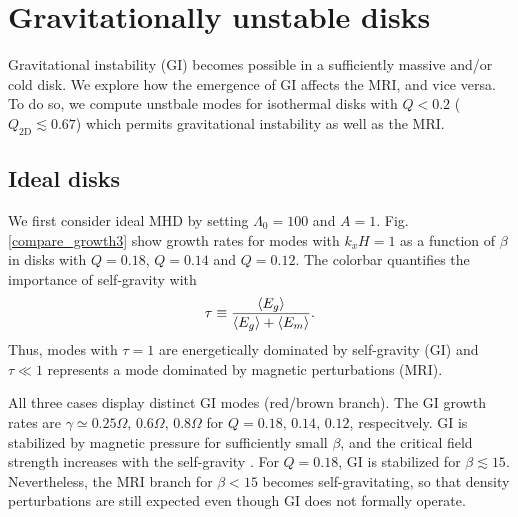 \section{Gravitationally unstable disks} 
Gravitational instability (GI) becomes possible in a sufficiently
massive and/or cold disk. We explore how the emergence of GI affects
the MRI, and vice versa. To do so, we compute unstbale modes for  
isothermal disks with $Q < 0.2 $ ($Q_\mathrm{2D}\lesssim 0.67$) which
permits gravitational instability as well as the MRI.  

\subsection{Ideal disks}
We first consider ideal MHD by setting $\Lambda_0=100$ and $A=1$. 
Fig. \ref{compare_growth3} show growth rates for 
modes with $k_xH=1$ as a function of $\beta$ in disks with $Q=0.18$,
$Q=0.14$ and $Q=0.12$. The colorbar quantifies the importance of
self-gravity with 
\begin{align}
 \tau \equiv \frac{\langle{E_g}\rangle}{\langle{E_g}\rangle + \langle{E_m}\rangle}. 
\end{align} 
Thus, modes with $\tau  = 1$ are
energetically dominated by self-gravity (GI) and $\tau\ll1$ represents a mode
dominated by magnetic perturbations (MRI).  

All three cases display distinct GI modes (red/brown branch). The GI
growth rates are $\gamma\simeq 0.25\Omega,\,0.6\Omega,\,0.8\Omega$ for
$Q=0.18,\,0.14,\,0.12$, respecitvely. GI is stabilized by magnetic
pressure for sufficiently small $\beta$, and the critical field
strength increases with the self-gravity \citep{nakamura83}. For
$Q=0.18$, GI is stabilized for $\beta \lesssim 15$. Nevertheless, 
the MRI branch for $\beta < 15$ becomes self-gravitating, so that
density perturbations are still expected even though  GI does not
formally operate.  


